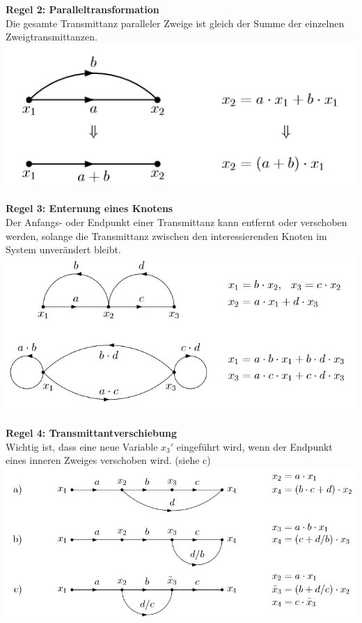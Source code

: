 \noindent\textbf{Regel 2: Paralleltransformation}\\
 Die gesamte Transmittanz paralleler Zweige ist gleich der Summe der einzelnen Zweigtransmittanzen.\\
\includegraphics[width=\columnwidth]{Images/sfd_r2}~\\

\noindent\textbf{Regel 3: Enternung eines Knotens}\\
 Der Anfangs- oder Endpunkt einer Transmittanz kann entfernt
oder verschoben werden, solange die Transmittanz zwischen
den interessierenden Knoten im System unverändert bleibt.\\
\includegraphics[width=\columnwidth]{Images/sfd_r3}~\\

\noindent\textbf{Regel 4: Transmittantverschiebung}\\
 Wichtig ist, dass eine neue Variable $x_3'$ eingeführt wird, wenn
der Endpunkt eines inneren Zweiges verschoben wird. (siehe c)\\
\includegraphics[width=\columnwidth]{Images/sfd_r4}~\\

